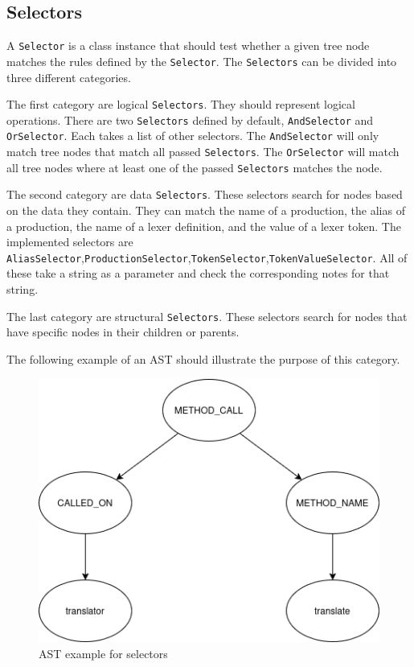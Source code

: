 
\subsection{Selectors}

A \verb|Selector| is a class instance that should test whether a given tree node matches the rules defined by the \verb|Selector|. 
The \verb|Selectors| can be divided into three different categories.

The first category are logical \verb|Selectors|. They should represent logical operations. 
There are two \verb|Selectors| defined by default, \verb|AndSelector| and \verb|OrSelector|. 
Each takes a list of other selectors. The \verb|AndSelector| will only match tree nodes that match all passed \verb|Selectors|. 
The \verb|OrSelector| will match all tree nodes where at least one of the passed \verb|Selectors| matches the node.


The second category are data \verb|Selectors|. 
These selectors search for nodes based on the data they contain. 
They can match the name of a production, the alias of a production, the name of a lexer definition, and the value of a lexer token. 
The implemented selectors are \verb|AliasSelector|,\verb|ProductionSelector|,\verb|TokenSelector|,\verb|TokenValueSelector|. 
All of these take a string as a parameter and check the corresponding notes for that string.


The last category are structural \verb|Selectors|. 
These selectors search for nodes that have specific nodes in their children or parents.

The following example of an AST should illustrate the purpose of this category.

\begin{figure}[H]
    \centering
	\includegraphics[scale=0.4]{"fig/selector_ast_example.png"}
    \caption{AST example for selectors}
\end{figure}

